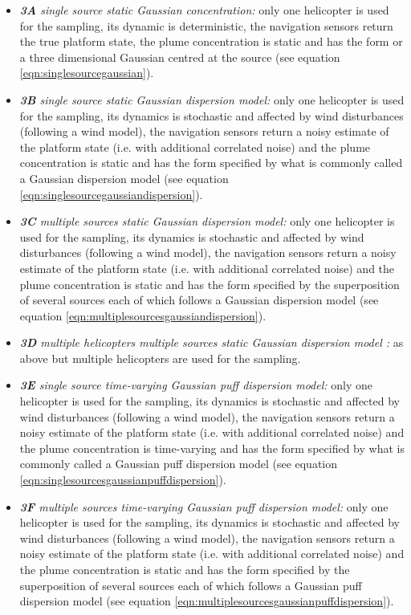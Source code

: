 \documentclass[a4paper,11pt]{report}
\begin{document}
\begin{itemize}
\item \textit{\textbf{3A} single source static Gaussian concentration:} only one helicopter is used for the sampling, its dynamic is deterministic, the navigation sensors return the true platform state, the plume concentration is static and has the form or a three dimensional Gaussian centred at the source (see equation \ref{eqn:singlesourcegaussian}).

\item \textit{\textbf{3B} single source static Gaussian dispersion model:} only one helicopter is used for the sampling, its dynamics is stochastic and affected by wind disturbances (following a wind model), the navigation sensors return a noisy estimate of the platform state (i.e. with additional correlated noise) and the plume concentration is static and has the form specified by what is commonly called a Gaussian dispersion model (see equation \ref{eqn:singlesourcegaussiandispersion}).

\item \textit{\textbf{3C} multiple sources static Gaussian dispersion model:} only one helicopter is used for the sampling, its dynamics is stochastic and affected by wind disturbances (following a wind model), the navigation sensors return a noisy estimate of the platform state (i.e. with additional correlated noise) and the plume concentration is static and has the form specified by the superposition of several sources each of which follows a Gaussian dispersion model (see equation \ref{eqn:multiplesourcesgaussiandispersion}).

\item \textit{\textbf{3D} multiple helicopters multiple sources static Gaussian dispersion model :} as above but multiple helicopters are used for the sampling.

\item \textit{\textbf{3E} single source time-varying Gaussian puff dispersion model:} only one helicopter is used for the sampling, its dynamics is stochastic and affected by wind disturbances (following a wind model), the navigation sensors return a noisy estimate of the platform state (i.e. with additional correlated noise) and the plume concentration is time-varying and has the form specified by what is commonly called a Gaussian puff dispersion model (see equation \ref{eqn:singlesourcesgaussianpuffdispersion}).

\item \textit{\textbf{3F} multiple sources time-varying Gaussian puff dispersion model:} only one helicopter is used for the sampling, its dynamics is stochastic and affected by wind disturbances (following a wind model), the navigation sensors return a noisy estimate of the platform state (i.e. with additional correlated noise) and the plume concentration is static and has the form specified by the superposition of several sources each of which follows a Gaussian puff dispersion model (see equation \ref{eqn:multiplesourcesgaussianpuffdispersion}).


\end{itemize}
\end{document}
